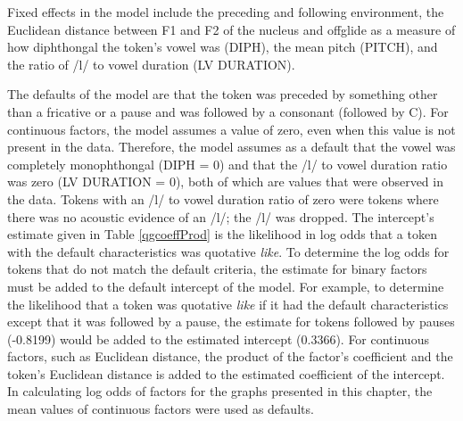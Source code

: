 Fixed effects in the model include the preceding and following environment, the Euclidean distance between F1 and F2 of the nucleus and offglide as a measure of how diphthongal the token's vowel was (DIPH), the mean pitch (PITCH), and the ratio of /l/ to vowel duration (LV DURATION).  

The defaults of the model are that the token was preceded by something other than a fricative or a pause and was followed by a consonant (followed by C).  For continuous factors, the model assumes a value of zero, even when this value is not present in the data.  Therefore, the model assumes as a default that the vowel was completely monophthongal (DIPH = 0) and that the /l/ to vowel duration ratio was zero (LV DURATION = 0), both of which are values that were observed in the data.  Tokens with an /l/ to vowel duration ratio of zero were tokens where there was no acoustic evidence of an /l/; the /l/ was dropped.  The intercept's estimate given in Table \ref{qgcoeffProd} is the likelihood in log odds that a token with the default characteristics was quotative \textit{like}.  To determine the log odds for tokens that do not match the default criteria, the estimate for binary factors must be added to the default intercept of the model.  For example, to determine the likelihood that a token was quotative \textit{like} if it had the default characteristics except that it was followed by a pause, the estimate for tokens followed by pauses (-0.8199) would be added to the estimated intercept (0.3366).    For continuous factors, such as Euclidean distance, the product of the factor's coefficient and the token's Euclidean distance is added to the estimated coefficient of the intercept.  In calculating log odds of factors for the graphs presented in this chapter, the mean values of continuous factors were used as defaults.


